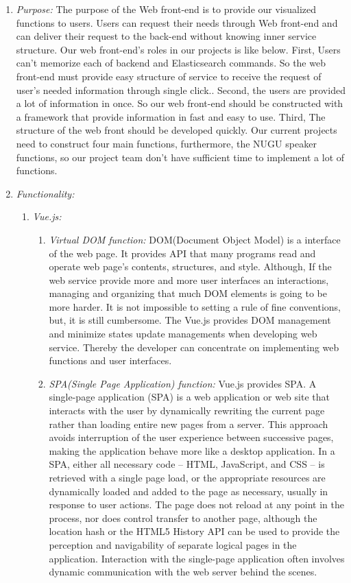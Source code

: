 \documentclass[conference]{IEEEtran}
\begin{document}
\vspace{30mm}
\begin{enumerate} 
  \item \textit{Purpose: } The purpose of the Web front-end is to provide our visualized functions to users. Users can request their needs through Web front-end and can deliver their request to the back-end without knowing inner service structure. Our web front-end’s roles in our projects is like below.
First, Users can’t memorize each of backend and Elasticsearch commands. So the web front-end must provide easy structure of service to receive the request of user’s needed information through single click..
Second, the users are provided a lot of information in once. So our web front-end should be constructed with a framework that provide information in fast and easy to use.
Third, The structure of the web front should be developed quickly. Our current projects need to construct four main functions, furthermore, the NUGU speaker functions, so our project team don’t have sufficient time to implement a lot of functions. \\
  \item \textit{Functionality: } 	
 \begin{enumerate}
	\item \textit {Vue.js: }  
	 \begin{enumerate}
	\item \textit {Virtual DOM function:} DOM(Document Object Model) is a interface of the web page. It provides API that many programs read and operate web page’s contents, structures, and style. Although, If the web service provide more and more user interfaces an interactions, managing and organizing that much DOM elements is going to be more harder. It is not impossible to setting a rule of fine conventions, but, it is still cumbersome. The Vue.js provides DOM management and minimize states update managements when developing web service. Thereby the developer can concentrate on implementing web functions and user interfaces.
	\item \textit {SPA(Single Page Application) function:} Vue.js provides SPA. A single-page application (SPA) is a web application or web site that interacts with the user by dynamically rewriting the current page rather than loading entire new pages from a server. This approach avoids interruption of the user experience between successive pages, making the application behave more like a desktop application. In a SPA, either all necessary code – HTML, JavaScript, and CSS – is retrieved with a single page load, or the appropriate resources are dynamically loaded and added to the page as necessary, usually in response to user actions. The page does not reload at any point in the process, nor does control transfer to another page, although the location hash or the HTML5 History API can be used to provide the perception and navigability of separate logical pages in the application. Interaction with the single-page application often involves dynamic communication with the web server behind the scenes.

\end{enumerate}
\end{enumerate}
\end{enumerate}
\end{document}
